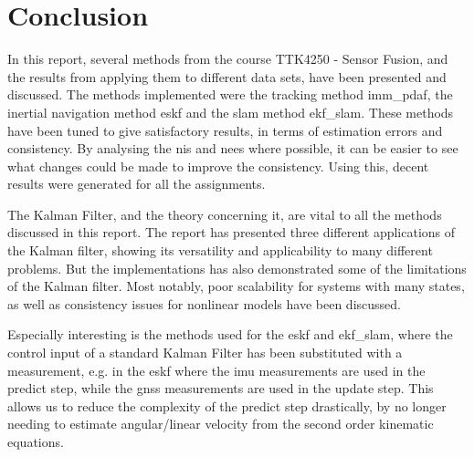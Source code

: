 \section{Conclusion}\label{sec:conclusion}
In this report, several methods from the course TTK4250 - Sensor Fusion, and the results from applying them to different data sets, have been presented and discussed. The methods implemented were the tracking method \acrshort{imm_pdaf}, the inertial navigation method \acrshort{eskf} and the \acrshort{slam} method \acrshort{ekf_slam}. These methods have been tuned to give satisfactory results, in terms of estimation errors and consistency. By analysing the \acrshort{nis} and \acrshort{nees} where possible, it can be easier to see what changes could be made to improve the consistency. Using this, decent results were generated for all the assignments. 

The Kalman Filter, and the theory concerning it, are vital to all the methods discussed in this report. The report has presented three different applications of the Kalman filter, showing its versatility and applicability to many different problems. But the implementations has also demonstrated some of the limitations of the Kalman filter. Most notably, poor scalability for systems with many states, as well as consistency issues for nonlinear models have been discussed.  

Especially interesting is the methods used for the \acrshort{eskf} and \acrshort{ekf_slam}, where the control input of a standard Kalman Filter has been substituted with a measurement, e.g. in the \acrshort{eskf} where the \acrshort{imu} measurements are used in the predict step, while the \acrshort{gnss} measurements are used in the update step. This allows us to reduce the complexity of the predict step drastically, by no longer needing to estimate angular/linear velocity from the second order kinematic equations. 






